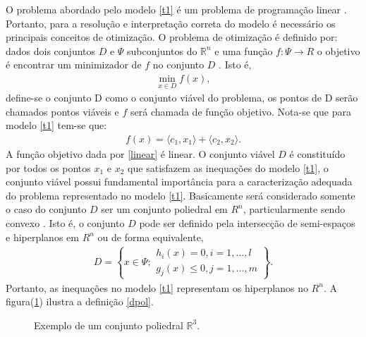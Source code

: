 O problema abordado pelo modelo \ref{t1}  \'e um problema de programa\c c\~ao linear \cite{alexey}. Portanto, para
a resolu\c c\~ao e interpreta\c c\~ao correta do modelo \'e necess\'ario os principais conceitos de otimiza\c c\~ao. O problema de otimiza\c c\~ao \'e definido por: dados dois conjuntos 
  $D $ e $\Psi$ subconjuntos do $\mathbb {R}^n$ e uma  fun\c c\~ao $f: \Psi
  \rightarrow R$ o objetivo \'e encontrar um minimizador de $f$ no conjunto $D$ \cite{alexey}. Isto \'e, 
  	\begin{align}%
		\label {obj}
	  	\min_{x\in D} f(x), 
	\end{align}
  define-se o conjunto D como o conjunto vi\'avel do problema, os pontos de D ser\~ao chamados pontos vi\'aveis e $f$ ser\'a chamada
  de fun\c c\~ao objetivo. Nota-se que para modelo \ref{t1} tem-se que: 
  \begin{align}
	  f(x) = \langle c_1,x_1\rangle + \langle c_2,x_2\rangle.
	  \label{linear}
  \end{align}
  A fun\c c\~ao objetivo dada por \ref{linear} \'e linear. O conjunto vi\'avel $D$ \'e constitu\'ido por todos os pontos
  $x_1$ e $x_2$ que satisfazem as inequa\c c\~oes do modelo \ref{t1}, o conjunto vi\'avel possui fundamental
  import\^ancia para a caracteriza\c c\~ao adequada do problema representado no modelo \ref{t1}. Basicamente ser\'a
  considerado somente o caso do conjunto $D$ ser um conjunto poliedral em $R^n$, particularmente sendo convexo
  \cite{alexey}. Isto \'e, o conjunto $D$ pode ser definido pela intersec\c c\~ao de semi-espa\c cos e hiperplanos em $R^n$
  ou de forma equivalente,
  \begin{align}
  		D = \left \{ x \in \Psi; \begin{array}{cc} h_i(x) = 0, i = 1, \dots, l \\ g_j(x) \leq 0, j = 1, \dots, m
		\end{array} \right \}.
		\label{dpol}
  \end{align}
Portanto, as inequa\c c\~oes no modelo \ref{t1} representam os hiperplanos no $R^n$. A figura(\ref{poli}) ilustra a defini\c c\~ao \ref{dpol}.
	\begin{figure}[!h]%
			\centering
			\resizebox{2.5\width}{!}{
			
			}
			\caption{Exemplo de um conjunto poliedral  $\mathbb{R}^3$.}
			\label{poli} 
		\end{figure}

